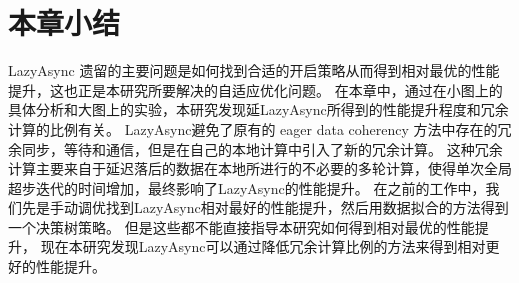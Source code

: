 
\section{本章小结}
LazyAsync 遗留的主要问题是如何找到合适的开启策略从而得到相对最优的性能提升，这也正是本研究所要解决的自适应优化问题。
在本章中，通过在小图上的具体分析和大图上的实验，本研究发现延LazyAsync所得到的性能提升程度和冗余计算的比例有关。
LazyAsync避免了原有的 eager data coherency 方法中存在的冗余同步，等待和通信，但是在自己的本地计算中引入了新的冗余计算。
这种冗余计算主要来自于延迟落后的数据在本地所进行的不必要的多轮计算，使得单次全局超步迭代的时间增加，最终影响了LazyAsync的性能提升。
在之前的工作中，我们先是手动调优找到LazyAsync相对最好的性能提升，然后用数据拟合的方法得到一个决策树策略。
但是这些都不能直接指导本研究如何得到相对最优的性能提升，
现在本研究发现LazyAsync可以通过降低冗余计算比例的方法来得到相对更好的性能提升。
